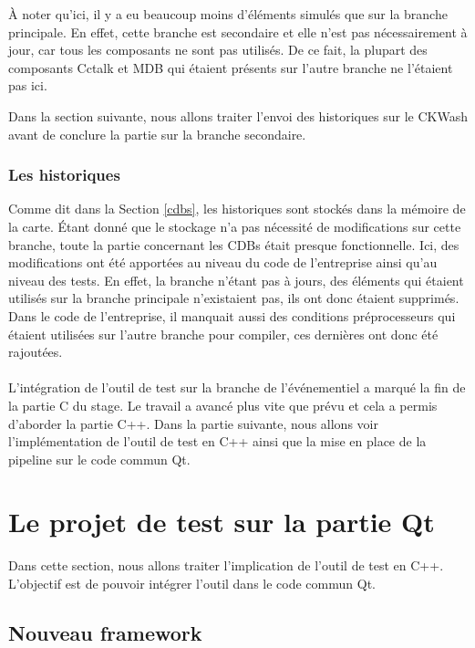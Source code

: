 \documentclass[a4paper]{article}
\begin{document}
À noter qu'ici, il y a eu beaucoup moins d'éléments simulés que sur la branche
principale. En effet, cette branche est secondaire et elle n'est pas
nécessairement à jour, car tous les composants ne sont pas utilisés. De ce fait,
la plupart des composants Cctalk et MDB qui étaient présents sur l'autre branche
ne l'étaient pas ici.

Dans la section suivante, nous allons traiter l'envoi des historiques sur le
CKWash avant de conclure la partie sur la branche secondaire.

\subsubsection*{Les historiques}

Comme dit dans la Section \ref{cdbs}, les historiques sont stockés dans la
mémoire de la carte. Étant donné que le stockage n'a pas nécessité de
modifications sur cette branche, toute la partie concernant les CDBs était presque
fonctionnelle. Ici, des modifications ont été apportées au niveau du code de
l'entreprise ainsi qu'au niveau des tests. En effet, la branche n'étant pas à
jours, des éléments qui étaient utilisés sur la branche principale n'existaient
pas, ils ont donc étaient supprimés. Dans le code de l'entreprise, il manquait
aussi des conditions préprocesseurs qui étaient utilisées sur l'autre branche
pour compiler, ces dernières ont donc été rajoutées.
\\~\\

L'intégration de l'outil de test sur la branche de l'événementiel a marqué la
fin de la partie C du stage. Le travail a avancé plus vite que prévu et cela a
permis d'aborder la partie C++. Dans la partie suivante, nous allons voir
l'implémentation de l'outil de test en C++ ainsi que la mise en place de la
pipeline sur le code commun Qt.
\section{Le projet de test sur la partie Qt}%

Dans cette section, nous allons traiter l'implication de l'outil de test en
C++. L'objectif est de pouvoir intégrer l'outil dans le code commun Qt.

\subsection{Nouveau framework}%
\label{nouvframe}
\end{document}

